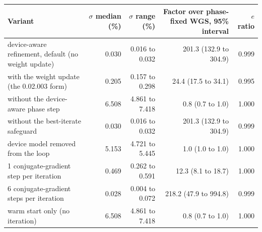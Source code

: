 \begin{tabular}{@{}l r r r r@{}}
\toprule
Variant & $\sigma$ median (\%) & $\sigma$ range (\%) & Factor over phase-fixed WGS, 95\% interval & $e$ ratio \\
\midrule
device-aware refinement, default (no weight update) & 0.030 & 0.016 to 0.032 & 201.3 (132.9 to 304.9) & 0.999 \\
with the weight update (the 0.02.003 form) & 0.205 & 0.157 to 0.298 & 24.4 (17.5 to 34.1) & 0.995 \\
without the device-aware phase step & 6.508 & 4.861 to 7.418 & 0.8 (0.7 to 1.0) & 1.000 \\
without the best-iterate safeguard & 0.030 & 0.016 to 0.032 & 201.3 (132.9 to 304.9) & 0.999 \\
device model removed from the loop & 5.153 & 4.721 to 5.445 & 1.0 (1.0 to 1.0) & 1.000 \\
1 conjugate-gradient step per iteration & 0.469 & 0.262 to 0.591 & 12.3 (8.1 to 18.7) & 1.000 \\
6 conjugate-gradient steps per iteration & 0.028 & 0.004 to 0.072 & 218.2 (47.9 to 994.8) & 0.999 \\
warm start only (no iteration) & 6.508 & 4.861 to 7.418 & 0.8 (0.7 to 1.0) & 1.000 \\
\bottomrule
\end{tabular}
